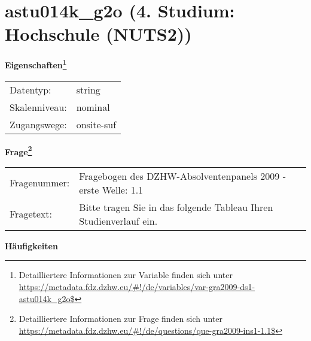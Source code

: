 
    \setcounter{footnote}{0}

    \vspace*{-1.8cm}
	\section{astu014k\_g2o (4. Studium: Hochschule (NUTS2))}
	\label{section:astu014k_g2o}



    \vspace*{0.5cm}
    \noindent\textbf{Eigenschaften\footnote{Detailliertere Informationen zur Variable finden sich unter
		\url{https://metadata.fdz.dzhw.eu/\#!/de/variables/var-gra2009-ds1-astu014k_g2o$}}}\\
	\begin{tabularx}{\hsize}{@{}lX}
	Datentyp: & string \\
	Skalenniveau: & nominal \\
	Zugangswege: &
	  onsite-suf
 \\
    \end{tabularx}



				\vspace*{0.5cm}
                \noindent\textbf{Frage\footnote{Detailliertere Informationen zur Frage finden sich unter
		              \url{https://metadata.fdz.dzhw.eu/\#!/de/questions/que-gra2009-ins1-1.1$}}}\\
				\begin{tabularx}{\hsize}{@{}lX}
					Fragenummer: &
					  Fragebogen des DZHW-Absolventenpanels 2009 - erste Welle:
					  1.1
 \\
					Fragetext: & Bitte tragen Sie in das folgende Tableau Ihren Studienverlauf ein. \\
				\end{tabularx}





        		\vspace*{0.5cm}
                \noindent\textbf{Häufigkeiten}


